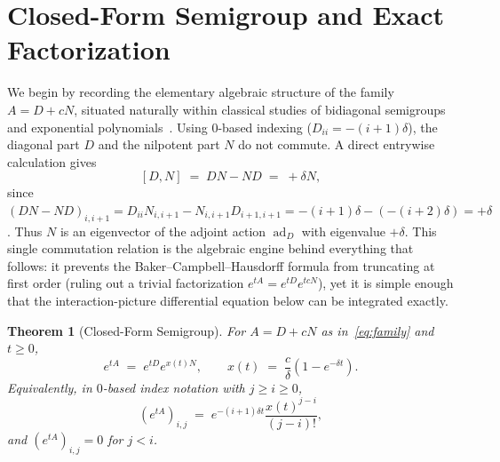 \documentclass[11pt,reqno]{article}
\theoremstyle{plain}
\newtheorem{theorem}{Theorem}[section]
\theoremstyle{definition}
\theoremstyle{remark}
\numberwithin{equation}{section}
\begin{document}
\section{Closed-Form Semigroup and Exact Factorization}\label{sec:semigroup}

We begin by recording the elementary algebraic structure of the family $A = D + cN$, situated naturally within classical studies of bidiagonal semigroups and exponential polynomials~\cite{Higham2008}. Using 0-based indexing ($D_{ii} = -(i+1)\delta$), the diagonal part $D$ and the nilpotent part $N$ do not commute. A direct entrywise calculation gives
\begin{equation}\label{eq:commutator}
  [D, N] \;=\; DN - ND \;=\; +\delta N,
\end{equation}
since $(DN - ND)_{i,i+1} = D_{ii}N_{i,i+1} - N_{i,i+1}D_{i+1,i+1} = -(i+1)\delta - (-(i+2)\delta) = +\delta$. Thus $N$ is an eigenvector of the adjoint action $\operatorname{ad}_D$ with eigenvalue $+\delta$. This single commutation relation is the algebraic engine behind everything that follows: it prevents the Baker--Campbell--Hausdorff formula from truncating at first order (ruling out a trivial factorization $e^{tA} = e^{tD}e^{tcN}$), yet it is simple enough that the interaction-picture differential equation below can be integrated exactly.

\begin{theorem}[Closed-Form Semigroup]\label{thm:semigroup}
For $A = D + cN$ as in~\eqref{eq:family} and $t \ge 0$,
\begin{equation}\label{eq:factorization}
  e^{tA} \;=\; e^{tD} e^{x(t)N}, \qquad x(t) \;=\; \frac{c}{\delta}\left(1 - e^{-\delta t}\right).
\end{equation}
Equivalently, in $0$-based index notation with $j \ge i \ge 0$,
\begin{equation}\label{eq:entrywise}
  \left(e^{tA}\right)_{i,j} \;=\; e^{-(i+1)\delta t} \frac{x(t)^{j-i}}{(j-i)!},
\end{equation}
and $\left(e^{tA}\right)_{i,j} = 0$ for $j < i$.
\end{theorem}
\end{document}
